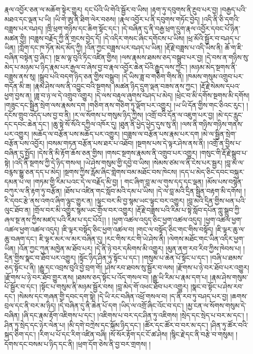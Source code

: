 རྣལ་འབྱོར་ཅན་ལ་མཆོག་སྟེར་གྱུར། དང་པོའི་ཡི་གེའི་སྦྱོར་བ་ཡིས། །རྟག་ཏུ་དབུགས་ནི་རྔུབ་པར་བྱ། །བརྒྱད་པའི་མཐའ་དང་ལྡན་པ་ཡི། །ཡི་གེ་ཨུ་ནི་ཐིག་ལེར་བཅས། །རྣལ་འབྱོར་པ་ནི་དབུགས་གཏོང་བྱེད། །འདི་ནི་ཅི་དགའི་བཟླས་པར་བཤད། །ཁྲི་ཕྲག་གཉིས་དང་ཆིག་སྟོང་དང་། །དེ་བཞིན་དུ་ནི་བརྒྱ་ཕྲག་དྲུག་རྣལ་འབྱོར་དབང་པོ་ཉིན་མཚན་གྱི། །བཟླས་བརྗོད་ཀྱི་ནི་གྲངས་བྱེད་དོ། །དེ་འདིར་གསང་ཞིང་དགོངས་པ་ཡིས། །ཕྲ་མོའི་སྦྱོར་བ་བཤད་པ་ཡིན། །ཀློག་དང་ཁ་ཏོན་མེད་མོད་ཀྱི། །འོན་ཀྱང་བཟླས་པར་བཤད་པ་ཡིན། །རྡོ་རྗེ་བཟླས་པ་འདི་ཡིས་ནི། ཆོ་ག་ཇི་བཞིན་བསྟེན་བྱ་ཞིང་། །སྔ་མ་ལྟ་བུའི་ཏིང་འཛིན་གྱིས། །ལས་རྣམས་ཐམས་ཅད་བསྒྲུབ་པར་བྱ། །དེ་བས་ན་གཉིས་སུ་མེད་པ་མཉམ་པ་ཉིད་རྣམ་པར་རྒྱལ་བ་ཞེས་བྱ་བ་རྣལ་འབྱོར་ཆེན་པོའི་རྒྱུད་ལས་ཀྱང་། །མཉམ་མེད་སྔགས་ནི་བཟླས་ནས་སུ། །སྒྲུབ་པའི་བདག་ཉིད་ཅན་གྱིས་བསྒྲུབ། །དེ་ཡིས་ཟླ་བ་གཅིག་གིས་ནི། །ཁམས་གསུམ་འགྲུབ་པར་གདོན་མི་ཟ། །རྣམ་ཤེས་ལས་ནི་འབྱུང་བའི་སྔགས། །མཚན་ཉིད་དྲུག་ལྡན་བཟས་ནས་ཀྱང་། །རྡོ་རྗེ་སེམས་དཔའ་ཕྱག་བྱས་ན། །ཟླ་བ་ཉ་ལ་དེ་འགྲུབ་འགྱུར། །དེ་ལས་བརྟུལ་ཞུགས་བཤད་པ་མེད། །ཕྲེང་བ་མི་དགོས་སྔགས་མི་དགོས། །གཟུང་དང་སྦྱིན་སྲེག་ལས་རྣམས་དག །གཅིག་ནས་གཅིག་ཏུ་ལྡོག་པར་འགྱུར། །ཡ་ཡི་དོན་གྱིས་གང་ཅིའང་རུང་། །དངོས་གྲུབ་འདོད་པས་བྱ་བ་ནི། །ར་ལ་སོགས་པ་གསུམ་ཉིད་ཀྱིས། །འགྲོ་བའི་དོན་ལ་འཇུག་པར་བྱ། །མེ་དང་རླུང་དང་དབང་ཆེན་དང་། །ཆུ་སྟེ་སོ་སོའི་དཀྱིལ་འཁོར་དུ། །ཐུན་ནི་ཕྱེད་ཕྱེད་དུས་སུ་ནི། །ལས་ནི་གཉིས་གཉིས་གནས་པར་འགྱུར། །མཆོད་ལ་བརྩོན་པས་མཆོད་པར་འགྱུར། །བཟླས་ལ་བརྩོན་པས་རྣམ་པར་དག །མེ་ལ་སྦྱིན་སྲེག་བརྩོན་པས་འབྱོར། །བསམ་གཏན་བརྩོན་པས་ཐར་པ་འཐོབ། །སྔགས་པས་དེ་ལྟར་ཤེས་ནས་ནི། །འགྲོ་ན་བྱིས་པ་བཞིན་དུ་སྤྱོད། །དེས་ནི་མི་རྟོག་ཆོས་ཅན་གྱིས། །གསང་སྔགས་རྣམས་ནི་འགྲུབ་པར་འགྱུར། །གསུང་གི་རྡོ་རྗེ་སྒྲུབ་པ་སྟེ། །འདི་ནི་སྔགས་ཀྱི་དེ་ཉིད་གསལ། །ཡེ་ཤེས་གསུམ་གྱི་དབྱེ་བ་ཡིས། །སེམས་ཙམ་ལ་ནི་ངེས་པར་སྦྱར། །བླ་མ་ལ་བརྙས་སྒྱུ་ཅན་དད་པ་མེད། །སྔགས་ཀྱིས་རློམ་ཞིང་གླེགས་བམ་མཐོང་བས་ཁེངས། །དད་པ་མེད་ཅིང་དབང་བསྐུར་དམན་པ་ལ། །གཏམ་གྱི་རིམ་པའང་དེ་ལ་བརྗོད་མི་བྱ། །
གང་ཞིག་བླ་མ་ལ་གུས་དད་དང་ལྡན། །མོས་པས་བསྙེན་བཀུར་ལ་ནི་རྟག་ཏུ་བརྩོན། །ཐོས་པ་འཛིན་གང་སློབ་མའི་དམ་པ་ཡིས། །དེ་ལ་བླ་མའི་དྲིན་སྦྱིན་བརྟག་མི་དགོས། །རི་དབང་རྩེ་ནས་འགའ་ཞིག་ལྷུང་གྱུར་ན། །ལྟུང་བར་མི་བྱ་སྙམ་ཡང་ལྟུང་བར་འགྱུར། །བླ་མའི་དྲིན་གྱིས་ཕན་པའི་ལུང་ཐོབ་ན། །གྲོལ་བར་མི་འགྱུར་སྙམ་ཡང་གྲོལ་བར་འགྱུར། །རྡོ་རྗེ་བཟླས་པའི་རིམ་པ་སྟེ་སློབ་དཔོན་ཀླུ་སྒྲུབ་ཀྱི་ཞལ་སྔ་ནས་ཀྱིས་མཛད་པའི་རིམ་པ་དང་པོའོ༑། ། །ཕྱག་འཚལ་འདུད་ཅིང་ཕྱག་འཚལ་འདུད། །ཕྱག་འཚལ་ཕྱག་འཚལ་ཕྱག་འཚལ་འདུད། །ཇི་ལྟར་བསྟོད་ཅིང་ཕྱག་འཚལ་བ། །གང་ལ་བསྟོད་ཅིང་གང་གིས་བསྟོད། །ཇི་ལྟར་ཆུ་ལ་ཆུ་བཞག་དང་། ཇི་ལྟར་མར་ལ་མར་བཞིན་དུ། །རང་གིས་རང་གི་ཡེ་ཤེས་ནི། །ལེགས་མཐོང་གང་ཡིན་འདིར་ཕྱག་ཡིན། །འོན་ཀྱང་ཀུན་མཁྱེན་མ་ཐོབ་པར། །དེ་ནི་ཉེ་བར་དམིགས་མི་འགྱུར། །མུན་ནག་རབ་རིབ་ཀྱིས་ཁེབས་པ། །དྲིན་གྱིས་སྣང་བ་ཐོབ་པར་འགྱུར། །སྟོང་ཉིད་ཤིན་ཏུ་སྟོང་པ་དང་། །གསུམ་པ་ཆེན་པོ་སྟོང་པ་དང་། །བཞི་པ་ཐམས་ཅད་སྟོང་པ་ནི། །རྒྱུ་དང་འབྲས་བུའི་བྱེ་བྲག་གོ། །ཤེས་རབ་ཐབས་སུ་སྦྱོར་བ་ལས། །རྫོགས་པ་ཉེ་བར་ཐོབ་པར་འགྱུར། །རྫོགས་པ་ཉེ་བར་ཐོབ་གྱུར་ནས། །ཐམས་ཅད་སྟོང་པ་འོད་གསལ་བ། །རྒྱུ་ཡི་རིམ་པ་རྣམ་དག་པ། །རྣམ་ཤེས་གསུམ་པོ་སྦྱོར་བ་དང་། །སྟོང་པ་གསུམ་ནི་མཉམ་སྦྱོར་བས། །བླ་མེད་གོ་འཕང་ཐོབ་པར་འགྱུར། །སྣང་བ་སྟོང་པ་ཤེས་རབ་དང་། །སེམས་དང་གཞན་གྱི་དབང་དག་སྟེ། །དེ་ཡི་རང་བཞིན་འཕྲོ་གསལ་བ། །ད་ནི་རབ་ཏུ་བཤད་པར་བྱ། །ཆགས་བྲལ་དང་ནི་བར་མ་ཉིད། །དེ་བཞིན་དུ་ནི་ཆེན་པོ་དག །ཡིད་ལ་འགྲོ་ཞིང་འོང་བ་དང་། །མྱ་ངན་ལ་སོགས་གསུམ་དེ་བཞིན། །ཞི་དང་རྣམ་རྟོག་འཇིགས་པ་དང་། །འཇིགས་པ་བར་དང་ཤིན་ཏུ་འཇིགས། །སྲེད་དང་སྲེད་པ་བར་མ་དང་། །ཤིན་ཏུ་སྲེད་དང་ཉེར་ལེན་པ། །མི་དགེ་བཀྲེས་དང་སྐོམ་ཉིད་དང་། །ཚོར་དང་ཚོར་བ་བར་མ་དང་། །ཤིན་ཏུ་ཚོར་བའི་སྐད་ཅིག་དང་། །རིག་པ་པོ་དང་རིག་འཛིན་བཞི། །སོ་སོར་རྟོག་དང་ངོ་ཚ་ཤེས། །སྙིང་རྗེ་དང་ནི་བརྩེ་བ་གསུམ། །དོགས་དང་བསམ་པ་ཉིད་དང་ནི། །ཕྲག་དོག་ཅེས་ནི་བྱ་བར་གྲགས། །

